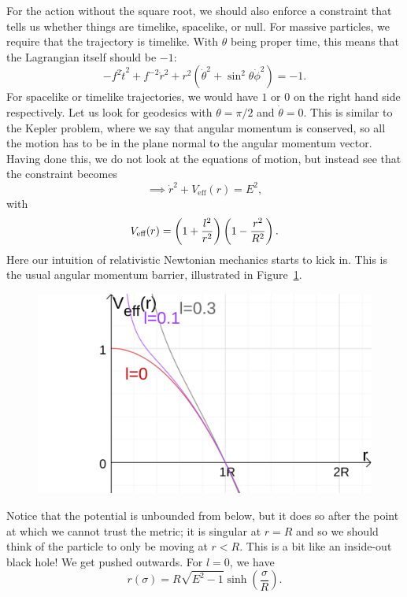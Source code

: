 For the action without the square root, we should also enforce a constraint that tells us whether things are timelike, spacelike, or null.
For massive particles, we require that the trajectory is timelike. With $\theta$ being proper time, this means that the Lagrangian itself should be $-1$:
\begin{equation}
  -f^2 \dot t^2 + f^{-2} \dot r^2 + r^2 (\dot \theta^2 + \sin^2\theta \dot \phi^2) = -1.
\end{equation}
For spacelike or timelike trajectories, we would have $1$ or $0$ on the right hand side respectively.
Let us look for geodesics with $\theta = \pi/2$ and $\dot \theta = 0$. This is similar to the Kepler problem, where we say that angular momentum is conserved, so all the motion has to be in the plane normal to the angular momentum vector.
Having done this, we do not look at the equations of motion, but instead see that the constraint becomes
\begin{equation}
  \implies \dot r^2 + V_{\text{eff}} (r) = E^2,
\end{equation}
with
\begin{equation}
  V_{\text{eff}}(r) = \qty(1 + \frac{l^2}{r^2}) \left( 1 - \frac{r^2}{R^2} \right).
\end{equation}
Here our intuition of relativistic Newtonian mechanics starts to kick in.
This is the usual angular momentum barrier, illustrated in Figure~\ref{fig:angmombar}.
\begin{figure}[tbph]
  \centering
  \includegraphics[width=0.6\columnwidth]{angmombar}
  \caption{}
  \label{fig:angmombar}
\end{figure}
Notice that the potential is unbounded from below, but it does so after the point at which we cannot trust the metric; it is singular at $r = R$ and so we should think of the particle to only be moving at $r < R$.
This is a bit like an inside-out black hole! We get pushed outwards.
For $l = 0$, we have
\begin{equation}
  r(\sigma) = R \sqrt{E^2 - 1} \sinh (\frac{\sigma}{R}).
\end{equation}
